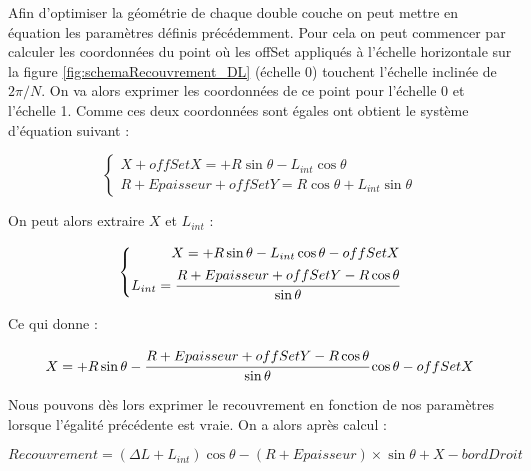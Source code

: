   \medskip

  Afin d'optimiser la g\'eom\'etrie de chaque double couche on peut mettre en \'equation les param\`etres d\'efinis pr\'ec\'edemment. Pour cela on peut commencer par calculer les coordonn\'ees du point o\`u les offSet appliqu\'es \`a l'\'echelle horizontale sur la figure \ref{fig:schemaRecouvrement_DL} (\'echelle 0) touchent l'\'echelle inclin\'ee de $2\pi/N$. On va alors exprimer les coordonn\'ees de ce point pour l'\'echelle 0 et l'\'echelle 1. Comme ces deux coordonn\'ees sont \'egales ont obtient le syst\`eme d'\'equation suivant :
  
  \medskip
  
  \begin{equation}
   \left\{
   \begin{split}
     X + offSetX = +R \sin{\theta} - L_{int} \cos{\theta} \\
     R + Epaisseur + offSetY = R \cos{\theta} + L_{int} \sin{\theta}
   \end{split}
   \right.
  \end{equation}

  On peut alors extraire $X$ et $L_{int}$ :
  
  \begin{equation}
   \left\{
   \begin{split}
     X = +R \sin{\theta} - L_{int} \cos{\theta} - offSetX \\
     L_{int} =\cfrac{ R + Epaisseur + offSetY - R \cos{\theta} }{ \sin{\theta} }
   \end{split}
   \right.
  \end{equation}
   
  
  Ce qui donne :
  
  \begin{equation}
   X = +R \sin{\theta} - \cfrac{ R + Epaisseur + offSetY - R \cos{\theta} }{ \sin{\theta} } \cos{\theta} - offSetX
  \end{equation}
  
  Nous pouvons d\`es lors exprimer le recouvrement en fonction de nos param\`etres lorsque l'\'egalit\'e pr\'ec\'edente est vraie.  On a alors apr\`es calcul :

  \begin{equation}
   Recouvrement = \left( \Delta L + L_{int} \right) \cos{\theta} -(R+Epaisseur) \times \sin{\theta} + X - bordDroit  
  \end{equation}
  

